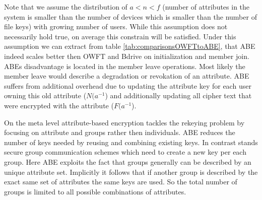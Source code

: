 Note that we assume the distribution of $a < n < f$ (number of attributes in the system is smaller than the number of devices which is smaller than the number of file keys) with growing number of users. While this assumption does not necessarily hold true, on average this constrain will be satisfied. Under this assumption we can extract from table \ref{tab:comparisonsOWFTtoABE}, that \ac{ABE} indeed scales better then \ac{OWFT} and Bdrive on initialization and member join. ABEs disadvantage is located in the member leave operations. Most likely the member leave would describe a degradation or revokation of an attribute. \ac{ABE} suffers from additional overhead due to updating the attribute key for each user owning this old attribute ($N(a^{-1}$) and additionally updating all cipher text that were encrypted with the attribute ($F(a^{-1}$).

On the meta level attribute-based encryption tackles the rekeying problem by focusing on attribute and groups rather then individuals. \ac{ABE} reduces the number of keys needed by reusing and combining existing keys. In contrast stands secure group communication schemes which need to create a new key per each group. Here \ac{ABE} exploits the fact that groups generally can be described by an unique attribute set. Implicitly it follows that if another group is described by the exact same set of attributes the same keys are used. So the total number of groups is limited to all possible combinations of attributes. 



